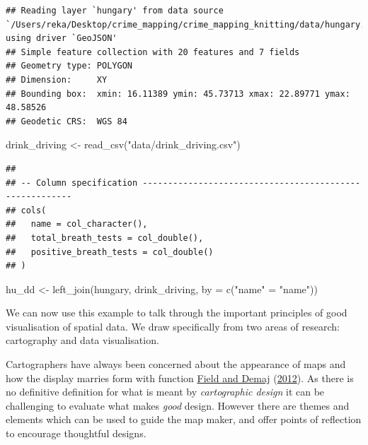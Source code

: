 \documentclass[
]{book}
\newenvironment{Shaded}{\begin{snugshade}}{\end{snugshade}}
\newcommand{\AttributeTok}[1]{\textcolor[rgb]{0.77,0.63,0.00}{#1}}
\newcommand{\FunctionTok}[1]{\textcolor[rgb]{0.00,0.00,0.00}{#1}}
\newcommand{\NormalTok}[1]{#1}
\newcommand{\OtherTok}[1]{\textcolor[rgb]{0.56,0.35,0.01}{#1}}
\newcommand{\StringTok}[1]{\textcolor[rgb]{0.31,0.60,0.02}{#1}}
\begin{document}
\begin{verbatim}
## Reading layer `hungary' from data source `/Users/reka/Desktop/crime_mapping/crime_mapping_knitting/data/hungary.geojson' using driver `GeoJSON'
## Simple feature collection with 20 features and 7 fields
## Geometry type: POLYGON
## Dimension:     XY
## Bounding box:  xmin: 16.11389 ymin: 45.73713 xmax: 22.89771 ymax: 48.58526
## Geodetic CRS:  WGS 84
\end{verbatim}

\begin{Shaded}
\begin{Highlighting}[]
\NormalTok{drink\_driving }\OtherTok{\textless{}{-}} \FunctionTok{read\_csv}\NormalTok{(}\StringTok{"data/drink\_driving.csv"}\NormalTok{)}
\end{Highlighting}
\end{Shaded}

\begin{verbatim}
## 
## -- Column specification --------------------------------------------------------
## cols(
##   name = col_character(),
##   total_breath_tests = col_double(),
##   positive_breath_tests = col_double()
## )
\end{verbatim}

\begin{Shaded}
\begin{Highlighting}[]
\NormalTok{hu\_dd }\OtherTok{\textless{}{-}} \FunctionTok{left\_join}\NormalTok{(hungary, drink\_driving, }\AttributeTok{by =} \FunctionTok{c}\NormalTok{(}\StringTok{"name"} \OtherTok{=} \StringTok{"name"}\NormalTok{))}
\end{Highlighting}
\end{Shaded}

We can now use this example to talk through the important principles of good visualisation of spatial data. We draw specifically from two areas of research: cartography and data visualisation.

Cartographers have always been concerned about the appearance of maps and how the display marries form with function \protect\hyperlink{ref-Field_2012}{Field and Demaj} (\protect\hyperlink{ref-Field_2012}{2012}). As there is no definitive definition for what is meant by \emph{cartographic design} it can be challenging to evaluate what makes \emph{good} design. However there are themes and elements which can be used to guide the map maker, and offer points of reflection to encourage thoughtful designs.
\end{document}
